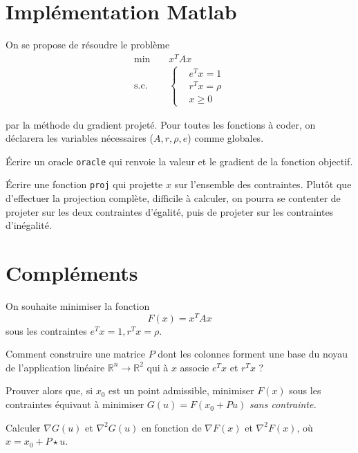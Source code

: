 \documentclass[12pt,a4paper,fleqn]{report}
\newcommand{\R}{\mathbb R}
\newcommand{\grad}{\nabla}
\newcommand{\hess}{\nabla^2}
\newcommand{\on}{\begin{displaymath}}
\newcommand{\off}{\end{displaymath}}
\begin{document}
\section{Implémentation Matlab}
\begin{exercice}
  On se propose de résoudre le problème
\begin{align*}
  \text{min} \;\;\;\;&x^{T} A x\\
  \text{s.c.}\;\;\;\;&\begin{cases}
    &e^{T} x = 1\\
  &r^{T} x = \rho\\
  &x \geq 0
  \end{cases}
\end{align*}

par la méthode du gradient projeté. Pour toutes les fonctions à coder,
on déclarera les variables nécessaires ($A, r, \rho, e$) comme
globales.
\begin{questions}
\item Écrire un oracle \verb+oracle+ qui renvoie la valeur et le
  gradient de la fonction objectif.
\item Écrire une fonction \verb+proj+ qui projette $x$ sur l'ensemble
  des contraintes. Plutôt que d'effectuer la projection complète,
  difficile à calculer, on pourra se contenter de projeter sur les
  deux contraintes d'égalité, puis de projeter sur les contraintes
  d'inégalité.
\end{questions}

\end{exercice}

\section{Compléments}
\begin{exercice}
On souhaite minimiser la fonction
\on F(x)=x^T A x \off
sous les contraintes $e^{T} x=1, r^{T}x = \rho$.
\begin{questions}
\item Comment construire une matrice $P$ dont les colonnes forment une
  base du noyau de l'application lin\'eaire $\R^{n} \to \R^{2}$ qui
  \`a $x$ associe $e^{T} x$ et $r^{T} x$ ?
\item Prouver alors que, si $x_{0}$ est un point admissible, minimiser
  $F(x)$ sous les contraintes \'equivaut \`a minimiser $G(u)=F(x_0+P
  u)$ \it sans \rm contrainte.
\item Calculer $\grad G(u)$ et $\hess G(u)$ en fonction de $\grad
  F(x)$ et $\hess F(x)$, o\`u $x=x_0 + P \star u$.
\end{questions}
\end{exercice}
\end{document}

